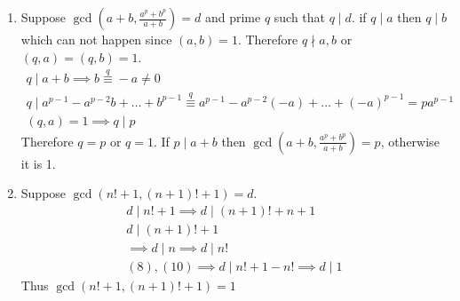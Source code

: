 \begin{enumerate}[label=\textbf{(\textit{\roman*})}]
    \item 
        Suppose $\gcd(a + b, \frac{a^p + b^p}{a + b}) = d$ and prime $q$ such that $q \mid d$. if $q \mid a$ then $q \mid b$ which can not happen since $(a, b) = 1$. Therefore $q \nmid a, b$ or $(q, a) = (q, b) = 1$.
        \begin{gather*}
            q \mid a + b \implies b \overset{q}{\equiv} -a \ne 0\\
            q \mid a^{p - 1} - a^{p-2}b + \dots + b^{p - 1} \overset{q}{\equiv } a^{p - 1} - a^{p - 2}(-a) + \dots + (-a)^{p - 1} = p a^{p - 1} \\
            (q, a) = 1 \implies q \mid p
        \end{gather*}
        Therefore $q = p$ or $q = 1$. If $p \mid a + b$ then $\gcd(a+b, \frac{a^p + b^p}{a + b}) = p$, otherwise it is 1.
    \item  
        Suppose $\gcd(n! + 1, (n + 1)! + 1) = d$.
        \begin{align}
            d \mid n! + 1 \implies d \mid (n + 1)! + n + 1 \\
            d \mid (n + 1)! + 1 \\
            \implies d \mid n \implies d \mid n! \\
            (8), (10) \implies d \mid n! + 1 - n! \implies d \mid 1
        \end{align}
        Thus $\gcd(n! + 1, (n + 1)! + 1) = 1$
\end{enumerate}